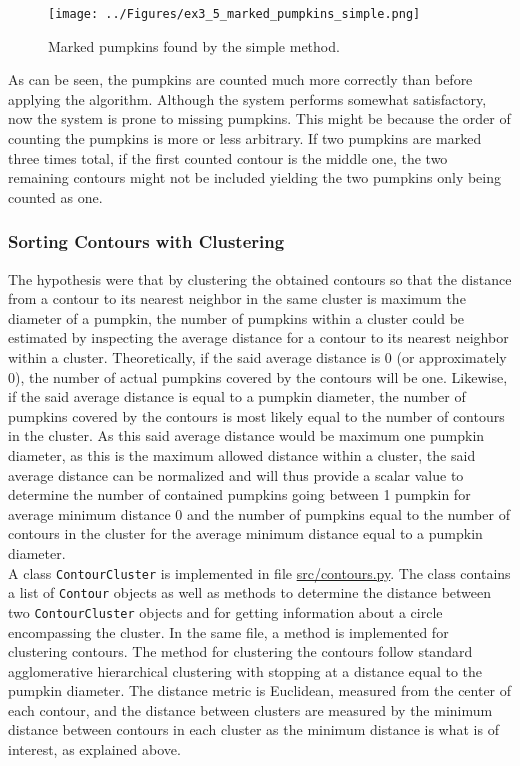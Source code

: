 \documentclass[../Head/Main.tex]{subfiles}
\begin{document}
\begin{figure}[H]
\centering
\texttt{[image: ../Figures/ex3\_5\_marked\_pumpkins\_simple.png]}
\caption{Marked pumpkins found by the simple method.}
\label{fig:pumpkinsSimple}
\end{figure}

As can be seen, the pumpkins are counted much more correctly than before applying the algorithm. Although the system performs somewhat satisfactory, now the system is prone to missing pumpkins. This might be because the order of counting the pumpkins is more or less arbitrary. If two pumpkins are marked three times total, if the first counted contour is the middle one, the two remaining contours might not be included yielding the two pumpkins only being counted as one. 

\subsubsection{Sorting Contours with Clustering}
The hypothesis were that by clustering the obtained contours so that the distance from a contour to its nearest neighbor in the same cluster is maximum the diameter of a pumpkin, the number of pumpkins within a cluster could be estimated by inspecting the average distance for a contour to its nearest neighbor within a cluster. Theoretically, if the said average distance is 0 (or approximately 0), the number of actual pumpkins covered by the contours will be one. Likewise, if the said average distance is equal to a pumpkin diameter, the number of pumpkins covered by the contours is most likely equal to the number of contours in the cluster. As this said average distance would be maximum one pumpkin diameter, as this is the maximum allowed distance within a cluster, the said average distance can be normalized and will thus provide a scalar value to determine the number of contained pumpkins going between 1 pumpkin for average minimum distance 0 and the number of pumpkins equal to the number of contours in the cluster for the average minimum distance equal to a pumpkin diameter.\\
A class \verb+ContourCluster+ is implemented in file \url{src/contours.py}. The class contains a list of \verb+Contour+ objects as well as methods to determine the distance between two \verb+ContourCluster+ objects and for getting information about a circle encompassing the cluster. In the same file, a method is implemented for clustering contours. The method for clustering the contours follow standard agglomerative hierarchical clustering with stopping at a distance equal to the pumpkin diameter. The distance metric is Euclidean, measured from the center of each contour, and the distance between clusters are measured by the minimum distance between contours in each cluster as the minimum distance is what is of interest, as explained above.\par
\end{document}
